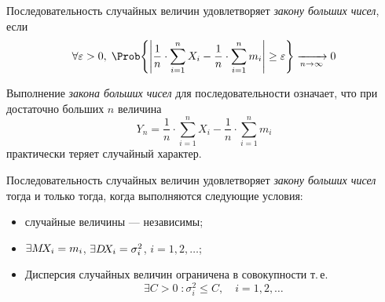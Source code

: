 \begin{defn}
	Последовательность случайных величин \infseqX удовлетворяет \emph{закону больших чисел}, если 
	\[\forall\varepsilon > 0,\; \Prob\Biggl\{ \Biggl|\frac{1}{n}\cdot\sum_{i = 1}^{n} X_i - \frac{1}{n}\cdot\sum_{i = 1}^{n} m_i\Biggr| \geq \varepsilon \Biggr\} \xrightarrow[n\to\infty]{} 0\]
\end{defn}

\begin{rem}
	Выполнение \emph{закона больших чисел} для последовательности \infseqX означает, что при достаточно больших $n$ величина
	\[
		Y_n = \frac{1}{n}\cdot\sum_{i = 1}^{n} X_i - \frac{1}{n}\cdot\sum_{i = 1}^{n} m_i
	\]
	практически теряет случайный характер.
\end{rem}

\begin{thm} Последовательность случайных величин \infseqX удовлетворяет \emph{закону больших чисел} тогда и только тогда, когда выполняются следующие условия:
	\begin{itemize}
		\item случайные величины \infseqX --- независимы;
		\item $\exists M\!X_i = m_i$, $\exists D\!X_i = \sigma_i^2$, $i = 1, 2, \dots$;
		\item Дисперсия случайных величин ограничена в совокупности т.\,е. 
		\[
			\exists C > 0\; \colon \sigma_i^2 \leq C, \quad i = 1, 2, \dots
		\]
	\end{itemize}
\end{thm}

